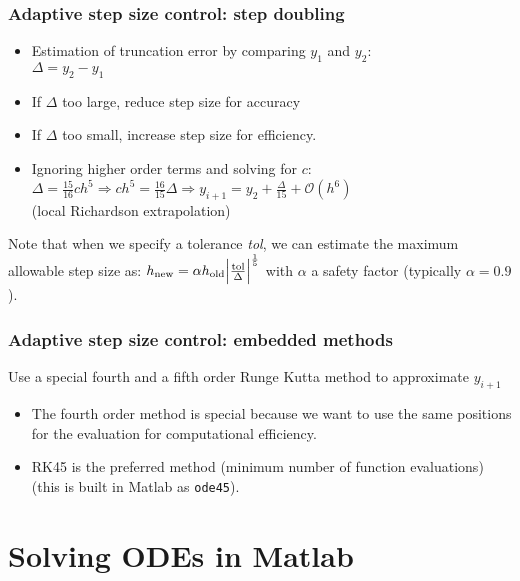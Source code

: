 \documentclass[11pt,table,final,fleqn,xcolor={usenames,dvipsnames,table}]{beamer}
\begin{document}
\begin{frame}
  \frametitle{Adaptive step size control: step doubling}
\begin{itemize}
  \item Estimation of truncation error by comparing $y_1$ and $y_2$:\\
  $\Delta = y_2 - y_1$
  \item If $\Delta$ too large, reduce step size for accuracy
  \item If $\Delta$ too small, increase step size for efficiency.
  \item Ignoring higher order terms and solving for $c$:
  $ \Delta = \frac{15}{16}ch^5 \Rightarrow ch^5 = \frac{16}{15} \Delta \Rightarrow y_{i+1} = y_2 + \frac{\Delta}{15} + \mathcal{O}{(h^6)}$ \\ (local Richardson extrapolation)
\end{itemize}
  Note that when we specify a tolerance \emph{tol}, we can estimate the maximum allowable step size as:
  $ h_\text{new} = \alpha h_\text{old} \abs{\frac{\text{tol}}{\Delta}}^{\frac{1}{5}}$ with $\alpha$ a safety factor (typically $\alpha = 0.9$).
\end{frame}

\begin{frame}
  \frametitle{Adaptive step size control: embedded methods}
  Use a special fourth and a fifth order Runge Kutta method to approximate $y_{i+1}$
  \begin{itemize}
    \item The fourth order method is special because we want to use the same positions for the evaluation for computational efficiency.
    \item RK45 is the preferred method (minimum number of function evaluations) (this is built in Matlab as \lstinline$ode45$).
  \end{itemize}
\end{frame}

\section{Solving ODEs in Matlab}
\end{document}
